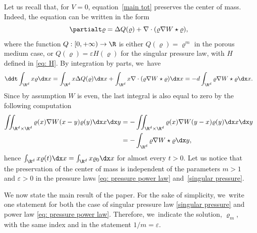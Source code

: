 \begin{remark}\label{rmk: center mass}
Let us recall that, for $V=0$, equation~\eqref{main tot} preserves the center of mass. Indeed, the equation can be written in the form
\begin{equation*}
\partialt \varrho = \Delta Q(\varrho) + \nabla\cdot(\varrho \nabla W \star \varrho),
\end{equation*}
where the function $Q:[0,+\infty)\to \R$ is either $Q(\varrho)=\varrho^m$ in the porous medium case, or $Q(\varrho)=\varepsilon H(\varrho)$ for the singular pressure law, with $H$ defined in \eqref{eq: H}. By integration by parts, we~have
\begin{align*}
\ddt \int_{\R^d} x \varrho \dx x = \int_{\R^d} x \Delta Q(\varrho) \dx x+ \int_{\R^d} x \nabla \cdot(\varrho\nabla W\star \varrho)\dx x=-d\int_{\R^d} \varrho\nabla W\star \varrho\dx x.
\end{align*}
Since by assumption $W$ is even, the last integral is also equal to zero by the following computation
\begin{align*}
\iint_{\R^d\times\R^d} \varrho(x)\nabla W(x-y) \varrho(y)\dx x \dx y &= - \iint_{\R^d\times\R^d} \varrho(x)\nabla W(y-x) \varrho(y)\dx x \dx y \\
&= -\int_{\R^d} \varrho \nabla W \star \varrho \dx y,
\end{align*}
hence $\int_{\R^d} x \varrho(t)\dx x=\int_{\R^d} x \varrho_0\dx x$ for almost every $t>0$. Let us notice that the preservation of the center of mass is independent of the parameters $m>1$ and $\varepsilon>0$ in the pressure laws \eqref{eq: pressure power law} and~\eqref{singular pressure}.
\end{remark}

We now state the main result of the paper. For the sake of simplicity, we~write one statement for both the case of singular pressure law \eqref{singular pressure} and power law \eqref{eq: pressure power law}. Therefore, we~indicate the solution, $\varrho_m$, with the same index and in the statement $1/m=\varepsilon.$


